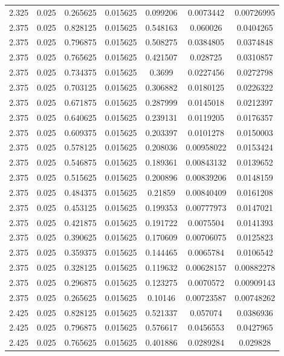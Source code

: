 \begin{flushleft}
\begin{longtable}{ccccccc}
2.325 & 0.025 & 0.265625 & 0.015625 & 0.099206 & 0.0073442 & 0.00726995  \\ 
2.375 & 0.025 & 0.828125 & 0.015625 & 0.548163 & 0.060026 & 0.0404265  \\ 
2.375 & 0.025 & 0.796875 & 0.015625 & 0.508275 & 0.0384805 & 0.0374848  \\ 
2.375 & 0.025 & 0.765625 & 0.015625 & 0.421507 & 0.028725 & 0.0310857  \\ 
2.375 & 0.025 & 0.734375 & 0.015625 & 0.3699 & 0.0227456 & 0.0272798  \\ 
2.375 & 0.025 & 0.703125 & 0.015625 & 0.306882 & 0.0180125 & 0.0226322  \\ 
2.375 & 0.025 & 0.671875 & 0.015625 & 0.287999 & 0.0145018 & 0.0212397  \\ 
2.375 & 0.025 & 0.640625 & 0.015625 & 0.239131 & 0.0119205 & 0.0176357  \\ 
2.375 & 0.025 & 0.609375 & 0.015625 & 0.203397 & 0.0101278 & 0.0150003  \\ 
2.375 & 0.025 & 0.578125 & 0.015625 & 0.208036 & 0.00958022 & 0.0153424  \\ 
2.375 & 0.025 & 0.546875 & 0.015625 & 0.189361 & 0.00843132 & 0.0139652  \\ 
2.375 & 0.025 & 0.515625 & 0.015625 & 0.200896 & 0.00839206 & 0.0148159  \\ 
2.375 & 0.025 & 0.484375 & 0.015625 & 0.21859 & 0.00840409 & 0.0161208  \\ 
2.375 & 0.025 & 0.453125 & 0.015625 & 0.199353 & 0.00777973 & 0.0147021  \\ 
2.375 & 0.025 & 0.421875 & 0.015625 & 0.191722 & 0.0075504 & 0.0141393  \\ 
2.375 & 0.025 & 0.390625 & 0.015625 & 0.170609 & 0.00706075 & 0.0125823  \\ 
2.375 & 0.025 & 0.359375 & 0.015625 & 0.144465 & 0.0065784 & 0.0106542  \\ 
2.375 & 0.025 & 0.328125 & 0.015625 & 0.119632 & 0.00628157 & 0.00882278  \\ 
2.375 & 0.025 & 0.296875 & 0.015625 & 0.123275 & 0.0070572 & 0.00909143  \\ 
2.375 & 0.025 & 0.265625 & 0.015625 & 0.10146 & 0.00723587 & 0.00748262  \\ 
2.425 & 0.025 & 0.828125 & 0.015625 & 0.521337 & 0.057074 & 0.0386936  \\ 
2.425 & 0.025 & 0.796875 & 0.015625 & 0.576617 & 0.0456553 & 0.0427965  \\ 
2.425 & 0.025 & 0.765625 & 0.015625 & 0.401886 & 0.0289284 & 0.029828  \\ 

\end{longtable}
\end{flushleft}
